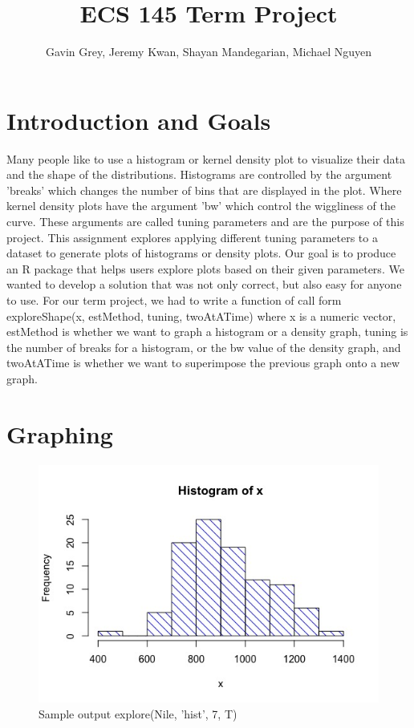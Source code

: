 \documentclass{article}
\title{ECS 145 Term Project}
\author{Gavin Grey, Jeremy Kwan, Shayan Mandegarian, Michael Nguyen}
\date{}
\begin{document}
\maketitle

\section{Introduction and Goals}
Many people like to use a histogram or kernel density plot to visualize their data and the shape of the distributions. Histograms are controlled by the argument 'breaks' which changes the number of bins that are displayed in the plot. Where kernel density plots have the argument 'bw' which control the wiggliness of the curve. These arguments are called tuning parameters and are the purpose of this project. 
This assignment explores applying different tuning parameters to a dataset to generate plots of histograms or density plots. Our goal is to produce an R package that helps users explore plots based on their given parameters. We wanted to develop a solution that was not only correct, but also easy for anyone to use.
For our term project, we had to write a function of call form exploreShape(x, estMethod, tuning, twoAtATime) where x is a numeric vector, estMethod is whether we want to graph a histogram or a density graph, tuning is the number of breaks for a histogram, or the bw value of the density graph, and twoAtATime is whether we want to superimpose the previous graph onto a new graph.


\section{Graphing}

\begin{figure}[H]
\centering
\includegraphics[scale=0.5]{Nile, 7 histogram.jpeg}
\caption{Sample output explore(Nile, 'hist', 7, T)}
\label{fig:Nile histogram 7}
\end{figure}
\end{document}
